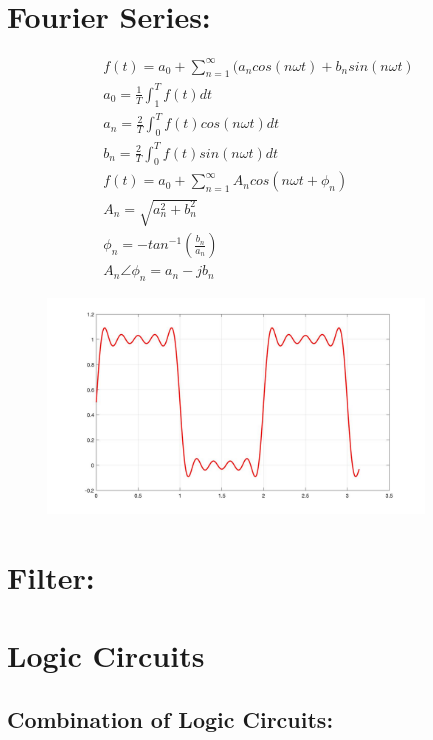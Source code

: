 \documentclass[a4paper,12]{article}
\begin{document}
     \section{Fourier Series:}
     \begin{gather}
         f(t)=a_0+\sum _{n=1}^\infty(a_n cos(n\omega t)+b_nsin(n\omega t)\\
         a_0=\frac{1}{T}\int_1^T f(t)dt\\
         a_n=\frac{2}{T}\int_0^T f(t)cos(n\omega t)dt\\
          b_n=\frac{2}{T}\int_0^T f(t)sin(n\omega t)dt\\
           f(t)=a_0+\sum _{n=1}^\infty A_n cos(n\omega t+\phi _n)\\
           A_n=\sqrt{a_n^2+b_n^2}\\
           \phi _n=-tan^{-1}(\frac{b_n}{a_n})\\
           A_n\angle \phi_n=a_n-jb_n
     \end{gather}
     \begin{figure}[H]
         \centering
         \includegraphics[width=100mm]{Image/Fourier.jpg}
     \end{figure}
     \section{Filter:}
     
     
     
     \cleardoublepage
     \section{Logic Circuits}
     \subsection{Combination of Logic Circuits:}
\end{document}
